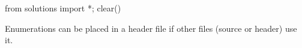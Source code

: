 \begin{python0}
from solutions import *; clear()
\end{python0}

Enumerations can be placed in a header file if other files (source or
header) use it.


